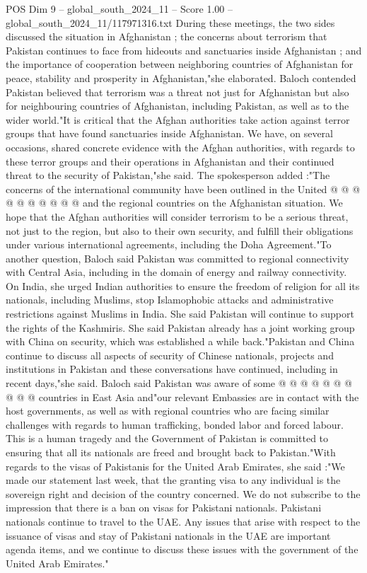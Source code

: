 \begin{textsample}{POS Dim 9 – global\_south\_2024\_11 – Score 1.00 – global\_south\_2024\_11/117971316.txt}
During these meetings, the two sides discussed the situation in Afghanistan ; the concerns about terrorism that Pakistan continues to face from hideouts and sanctuaries inside Afghanistan ; and the importance of cooperation between neighboring countries of Afghanistan for peace, stability and prosperity in Afghanistan,"she elaborated.
Baloch contended Pakistan believed that terrorism was a threat not just for Afghanistan but also for neighbouring countries of Afghanistan, including Pakistan, as well as to the wider world."It is critical that the Afghan authorities take action against terror groups that have found sanctuaries inside Afghanistan.
We have, on several occasions, shared concrete evidence with the Afghan authorities, with regards to these terror groups and their operations in Afghanistan and their continued threat to the security of Pakistan,"she said.
The spokesperson added :"The concerns of the international community have been outlined in the United @ @ @ @ @ @ @ @ @ @ and the regional countries on the Afghanistan situation.
We hope that the Afghan authorities will consider terrorism to be a serious threat, not just to the region, but also to their own security, and fulfill their obligations under various international agreements, including the Doha Agreement."To another question, Baloch said Pakistan was committed to regional connectivity with Central Asia, including in the domain of energy and railway connectivity.
On India, she urged Indian authorities to ensure the freedom of religion for all its nationals, including Muslims, stop Islamophobic attacks and administrative restrictions against Muslims in India.
She said Pakistan will continue to support the rights of the Kashmiris.
She said Pakistan already has a joint working group with China on security, which was established a while back."Pakistan and China continue to discuss all aspects of security of Chinese nationals, projects and institutions in Pakistan and these conversations have continued, including in recent days,"she said.
Baloch said Pakistan was aware of some @ @ @ @ @ @ @ @ @ @ countries in East Asia and"our relevant Embassies are in contact with the host governments, as well as with regional countries who are facing similar challenges with regards to human trafficking, bonded labor and forced labour.
This is a human tragedy and the Government of Pakistan is committed to ensuring that all its nationals are freed and brought back to Pakistan."With regards to the visas of Pakistanis for the United Arab Emirates, she said :"We made our statement last week, that the granting visa to any individual is the sovereign right and decision of the country concerned.
We do not subscribe to the impression that there is a ban on visas for Pakistani nationals.
Pakistani nationals continue to travel to the UAE.
Any issues that arise with respect to the issuance of visas and stay of Pakistani nationals in the UAE are important agenda items, and we continue to discuss these issues with the government of the United Arab Emirates."

\end{textsample}
